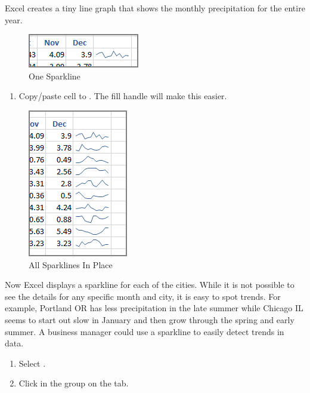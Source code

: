 Excel creates a tiny line graph that shows the monthly precipitation for the entire year. 

\begin{figure}[H]
	\centering
	\includegraphics[width=\maxwidth{.95\linewidth}]{gfx/ch08_fig03}
	\caption{One Sparkline}
	\label{08:fig03}
\end{figure}

\begin{enumerate}[resume]
	\item Copy/paste cell  to . The fill handle will make this easier. 
\end{enumerate}

\begin{figure}[H]
	\centering
	\includegraphics[width=\maxwidth{.95\linewidth}]{gfx/ch08_fig04}
	\caption{All Sparklines In Place}
	\label{08:fig04}
\end{figure}

Now Excel displays a sparkline for each of the cities. While it is not possible to see the details for any specific month and city, it is easy to spot trends. For example, Portland OR has less precipitation in the late summer while Chicago IL seems to start out slow in January and then grow through the spring and early summer. A business manager could use a sparkline to easily detect trends in data.

\begin{enumerate}[resume]
	\item Select .
	\item Click  in the  group on the  tab.
\end{enumerate}

